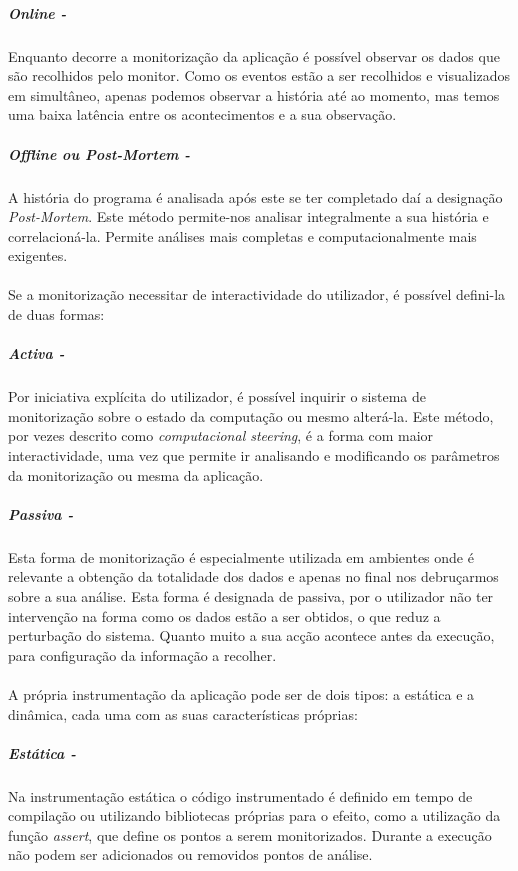 \subparagraph*{Online -}
Enquanto decorre a monitorização da aplicação é possível observar os dados que são recolhidos pelo monitor.
Como os eventos estão a ser recolhidos e visualizados em simultâneo, apenas podemos observar a história até ao momento, mas temos uma baixa latência entre os acontecimentos e a sua observação.

\subparagraph*{Offline ou \textit{Post-Mortem} - }

A história do programa é analisada após este se ter completado daí a designação \textit{Post-Mortem}.
Este método permite-nos analisar integralmente a sua história e correlacioná-la.
Permite análises mais completas e computacionalmente mais exigentes.

\paragraph*{}

Se a monitorização necessitar de interactividade do utilizador, é possível defini-la de duas formas:

\subparagraph*{Activa - }

Por iniciativa explícita do utilizador, é possível inquirir o sistema de monitorização sobre o estado da computação ou mesmo alterá-la.
Este método, por vezes descrito como \textit{computacional steering}, é a forma com maior interactividade, uma vez que permite ir analisando e modificando os parâmetros da monitorização ou mesma da aplicação.

\subparagraph*{Passiva - }
Esta forma de monitorização é especialmente utilizada em ambientes onde é relevante a obtenção da totalidade dos dados e apenas no final nos debruçarmos sobre a sua análise.
Esta forma é designada de passiva, por o utilizador não ter intervenção na forma como os dados estão a ser obtidos, o que reduz a perturbação do sistema.
Quanto muito a sua acção acontece antes da execução, para configuração da informação a recolher.

\paragraph*{}
A própria instrumentação da aplicação pode ser de dois tipos: a estática e a dinâmica, cada uma com as suas características próprias:

\subparagraph*{Estática - }

Na instrumentação estática o código instrumentado é definido em tempo de compilação ou utilizando bibliotecas próprias para o efeito, como a utilização da função \textit{assert}, que define os pontos a serem monitorizados.
Durante a execução não podem ser adicionados ou removidos pontos de análise.

